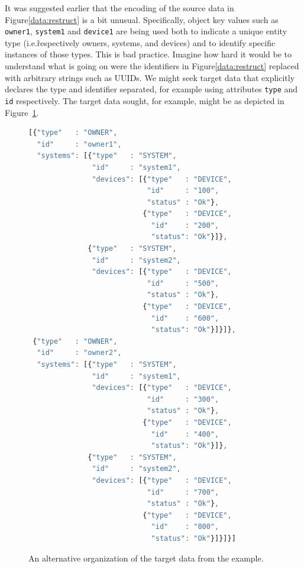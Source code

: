 \documentclass[10pt,letterpaper]{article} %
\newcommand{\stt}[1]{\texttt{#1}} %
\begin{document}
It was suggested earlier that the encoding of the source data in Figure\ref{data:restruct} is a bit unusual.
Specifically, object key values such as \stt{owner1}, \stt{system1} and \stt{device1} are being used both to indicate a unique entity type (i.e.\~respectively owners, systems, and devices) and to identify specific instances of those types.
This is bad practice.
Imagine how hard it would be to understand what is going on were the identifiers in Figure\ref{data:restruct} replaced with arbitrary strings such as UUIDs.
We might seek target data that explicitly declares the type and identifier separated, for example using attributes \stt{type} and \stt{id} respectively.
The target data sought, for example, might be as depicted in Figure~\ref{data:slack-with-keys}.

\begin{figure}[H]
  \caption{An alternative organization of the target data from the example.}
 \label{data:slack-with-keys}
\begin{lstlisting}[language=JavaScript,basicstyle=\ttfamily\scriptsize,numberstyle=\scriptsize]
[{"type"   : "OWNER",
  "id"     : "owner1",
  "systems": [{"type"   : "SYSTEM",
               "id"     : "system1",
               "devices": [{"type"   : "DEVICE",
                            "id"     : "100",
                            "status" : "Ok"},
                           {"type"   : "DEVICE",
                             "id"    : "200",
                             "status": "Ok"}]},
              {"type"   : "SYSTEM",
               "id"     : "system2",
               "devices": [{"type"   : "DEVICE",
                            "id"     : "500",
                            "status" : "Ok"},
                           {"type"   : "DEVICE",
                             "id"    : "600",
                             "status": "Ok"}]}]},
 {"type"   : "OWNER",
  "id"     : "owner2",
  "systems": [{"type"   : "SYSTEM",
               "id"     : "system1",
               "devices": [{"type"   : "DEVICE",
                            "id"     : "300",
                            "status" : "Ok"},
                           {"type"   : "DEVICE",
                             "id"    : "400",
                             "status": "Ok"}]},
              {"type"   : "SYSTEM",
               "id"     : "system2",
               "devices": [{"type"   : "DEVICE",
                            "id"     : "700",
                            "status" : "Ok"},
                           {"type"   : "DEVICE",
                             "id"    : "800",
                             "status": "Ok"}]}]}]
\end{lstlisting}
\end{figure}  \vspace{-2em}
\end{document}
